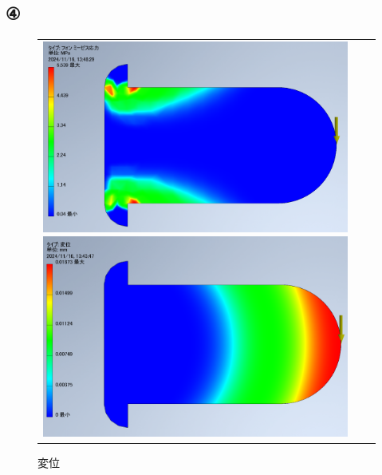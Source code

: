 \subsection{④}
  \begin{figure}[H]
    \begin{tabular}{ccc}
      \begin{minipage}{.5\textwidth}
        \centering
        \includegraphics[width=0.99\linewidth]{images/4_voms.png}
        \caption{応力}
        \label{img:4_voms}
      \end{minipage}
      \begin{minipage}{.5\textwidth}
        \centering
        \includegraphics[width=0.99\linewidth]{images/4_disp.png}
        \caption{変位}
        \label{img:4_disp}
      \end{minipage}
    \end{tabular}
  \end{figure}

